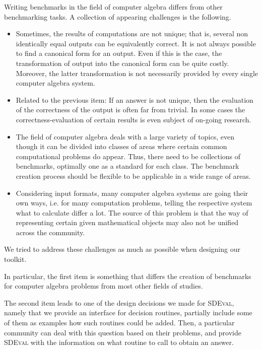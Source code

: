 \documentclass[12pt]{article}
\begin{document}
Writing benchmarks in the field of computer algebra differs from other
benchmarking tasks. A collection of appearing challenges is the following.
\begin{itemize}
\item Sometimes, the results of computations are not unique; that is, several
  non identically equal outputs can be equivalently correct. It is not always
  possible to find a canonical form for an output. Even if this is the case,
  the transformation of output into the canonical form can be quite
  costly. Moreover, the latter transformation is not necessarily provided by
  every single computer algebra system.
\item Related to the previous item: If an answer is not unique, then the
  evaluation of the correctness of the output is often far from trivial. In
  some cases the correctness-evaluation of certain results is even subject of
  on-going research.
\item The field of computer algebra deals with a large variety of topics, even
  though it can be divided into classes of areas where certain common
  computational problems do appear. Thus, there need to be collections of
  benchmarks, optimally one as a standard for each class. The benchmark
  creation process should be flexible to be applicable in a wide range of
  areas.
\item Considering input formats, many computer algebra systems are going their
  own ways, i.e. for many computation problems, telling the respective system
  what to calculate differ a lot. The source of this problem is that the way of
  representing certain given mathematical objects may also not be unified
  across the community.
\end{itemize}
We tried to address these challenges as much as possible when designing our
toolkit.

In particular, the first item is something that differs the creation of
benchmarks for computer algebra problems from most other fields of studies.

The second item leads to one of the design decisions we made for
\textsc{SDEval}, namely that we provide an interface for decision routines,
partially include some of them as examples how such routines could be added.
Then, a particular community can deal with this question based on their
problems, and provide \textsc{SDEval} with the information on what routine to
call to obtain an answer.
\end{document}
